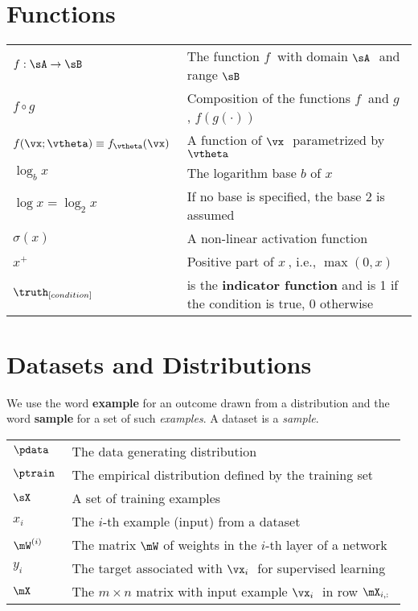 \section*{Functions}
\bgroup{}
\begin{tabular}{>{\centering}p{1.2in}p{4in}}
  \(\displaystyle f: \sA \rightarrow \sB~\) & The function \(f~\) with domain  \(\sA~\) and range  \(\sB~\) \\
  \(\displaystyle f \circ g ~\) & Composition of the functions \(f~\) and \(g~\), $f(g(\cdot))$ \\
  \(\displaystyle f(\vx ; \vtheta) \equiv f_{\vtheta}(\vx)~\) & A function of  \(\vx~\) parametrized by  \(\vtheta~\) \\
  \(\displaystyle \log_b x~\) & The logarithm base \(b\) of \(x~\) \\
  \(\displaystyle \log x=\log_2 x ~\) & If no base is specified, the base 2 is assumed \\

  \(\displaystyle \sigma(x)~\) & A non-linear activation function \\
  \(\displaystyle x^{+}~\) & Positive part of \(x~\), i.e.,  \(\max(0,x)~\) \\
  \(\displaystyle \truth_{[condition]} ~\) & is the \textbf{indicator function} and is 1 if the condition is true, 0 otherwise \\
\end{tabular}
\egroup{}


\section*{Datasets and Distributions}
We use the word \textbf{example} for an outcome drawn from a distribution and the word \textbf{sample} for a set of such \emph{examples}. A dataset is a \emph{sample}.
\bgroup\def\arraystretch{1.8}
\begin{tabular}{>{\centering}p{1.2in}p{4in}}
\(\displaystyle \pdata~\) & The data generating distribution\\
\(\displaystyle \ptrain~\) & The empirical distribution defined by the training set\\
\(\displaystyle \sX~\) & A set of training examples\\
\(\displaystyle x_i~\) & The  \(i\)-th example (input) from a dataset\\
\(\displaystyle \mW^{(i)}~\) & The matrix \(\mW \) of weights in the \(i\)-th layer of a network\\
\(\displaystyle y_i~\) & The target associated with  \(\vx_i~\) for supervised learning\\
\(\displaystyle \mX~\) & The \(m \times n \) matrix with input example  \(\vx_i~\) in row  \(\mX_{i,:}~\) \\
\end{tabular}
\egroup{}
\clearpage